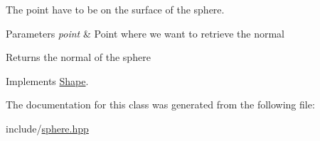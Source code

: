 The point have to be on the surface of the sphere.


\begin{DoxyParams}{Parameters}
{\em point} & Point where we want to retrieve the normal \\
\hline
\end{DoxyParams}
\begin{DoxyReturn}{Returns}
the normal of the sphere 
\end{DoxyReturn}


Implements \hyperlink{class_shape_a8444ffb396f26bd86c1c11bc6c47a74d}{Shape}.



The documentation for this class was generated from the following file\+:\begin{DoxyCompactItemize}
\item 
include/\hyperlink{sphere_8hpp}{sphere.\+hpp}\end{DoxyCompactItemize}
